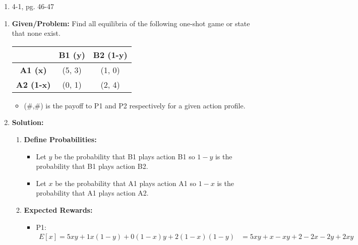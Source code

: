 \begin{example}
    \begin{enumerate}
        \item 4-1, pg. 46-47
    \end{enumerate}
\end{example}

\begin{example}
    \begin{enumerate}
        \item \textbf{Given/Problem:} Find all equilibria of the following one-shot game or state that none exist.
        \vspace{1em}
            \begin{center}
            \begin{tabular}{ccc}
            \toprule
            & \textbf{B1 (y)} & \textbf{B2 (1-y)} \\
            \midrule
            \textbf{A1 (x)} & (5, 3) & (1, 0) \\
            \textbf{A2 (1-x)} & (0, 1) & (2, 4) \\
            \bottomrule
            \end{tabular}
            \end{center}
        \vspace{1em}
        \begin{itemize}
            \item (\#,\#) is the payoff to P1 and P2 respectively for a given action profile.
        \end{itemize}
        \item \textbf{Solution:}
        \begin{enumerate}
            \item \textbf{Define Probabilities:}
            \begin{itemize}
                \item Let $y$ be the probability that B1 plays action B1 so $1-y$ is the probability that B1 plays action B2.
                \item Let $x$ be the probability that A1 plays action A1 so $1-x$ is the probability that A1 plays action A2.
            \end{itemize}
            \item \textbf{Expected Rewards:} 
            \begin{itemize}
                \item P1: 
                \begin{align*}
                    E[x] = 5xy + 1x(1-y) + 0(1-x)y + 2(1-x)(1-y) &= 5xy + x - xy + 2 - 2x - 2y + 2xy \\

\end{align*}
\end{itemize}
\end{enumerate}
\end{enumerate}
\end{example}
